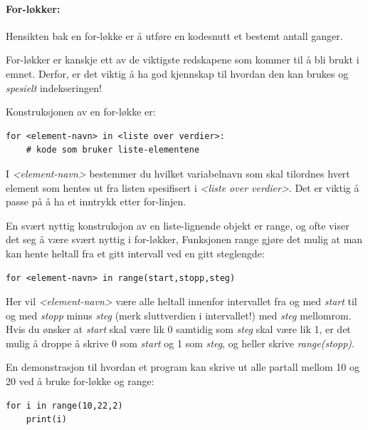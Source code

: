 \documentclass[%
oneside,                 %
final,                   %
10pt]{article}
\begin{document}
\vspace{3mm}


\paragraph{For-løkker:}


\vspace{3mm}


Hensikten bak en for-løkke er å utføre en kodesnutt et bestemt antall ganger.

For-løkker er kanskje ett av de viktigste redskapene som kommer til å bli brukt i emnet.
Derfor, er det viktig å ha god kjennskap til hvordan den kan brukes og \emph{spesielt} indekseringen!

Konstruksjonen av en for-løkke er:
\begin{verbatim}
for <element-navn> in <liste over verdier>:
    # kode som bruker liste-elementene
\end{verbatim}

I \emph{<element-navn>} bestemmer du hvilket variabelnavn som skal tilordnes hvert element som hentes ut fra listen spesifisert i \emph{<liste over verdier>}.
Det er viktig å passe på å ha et inntrykk etter for-linjen.


\vspace{3mm}


En svært nyttig konstruksjon av en liste-lignende objekt er range, og ofte viser det seg å være svært nyttig i for-løkker,
Funksjonen range gjøre det mulig at man kan hente heltall fra et gitt intervall ved en gitt steglengde:
\begin{verbatim}
for <element-navn> in range(start,stopp,steg)
\end{verbatim}
Her vil \emph{<element-navn>} være alle heltall innenfor intervallet fra og med \emph{start} til og med \emph{stopp} minus \emph{steg} (merk sluttverdien i intervallet!) med \emph{steg} mellomrom. Hvis du ønsker at \emph{start} skal være lik 0 samtidig som \emph{steg} skal være lik 1, er
det mulig å droppe å skrive 0 som \emph{start} og 1 som \emph{steg}, og heller skrive \emph{range(stopp)}.

En demonstrasjon til hvordan et program kan skrive ut alle partall mellom 10 og 20 ved å bruke for-løkke og range:
\begin{verbatim}
for i in range(10,22,2)
    print(i)
\end{verbatim}
\end{document}

